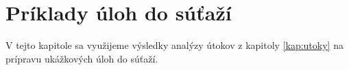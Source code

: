 \chapter{Príklady úloh do súťaží}

\label{kap:CTF} %

V tejto kapitole sa využijeme výsledky analýzy útokov z kapitoly \ref{kap:utoky} na prípravu ukážkových úloh do súťaží.